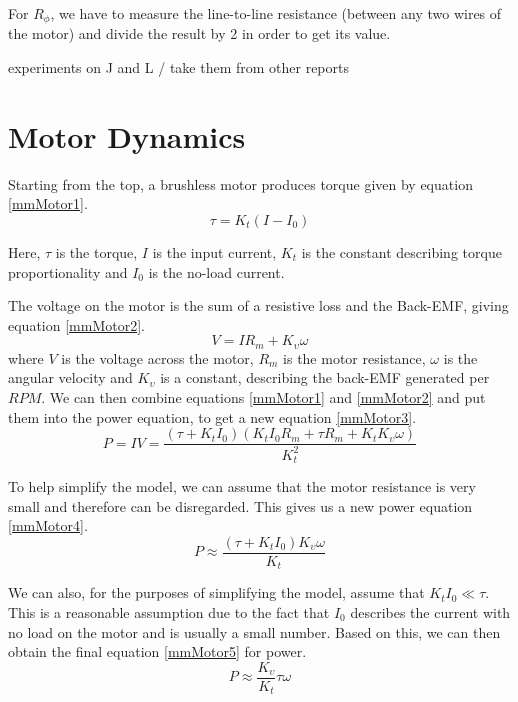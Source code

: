 For $R_{\phi}$, we have to measure the line-to-line resistance (between any two wires of the motor) and divide the result by 2 in order to get its value.

experiments on J and L / take them from other reports 

\clearpage

\section{Motor Dynamics}
Starting from the top, a brushless motor produces torque given by equation \ref{mmMotor1}.
\begin{equation}
\label{mmMotor1}
	\tau = K_t(I-I_0)
\end{equation}

Here, $\tau$ is the torque, $I$ is the input current, $K_t$ is the constant describing torque proportionality and $I_0$ is the no-load current.

The voltage on the motor is the sum of a resistive loss and the Back-EMF, giving equation \ref{mmMotor2}.
\begin{equation}
\label{mmMotor2}
	V = IR_m + K_\upsilon \omega
\end{equation}
where $V$ is the voltage across the motor, $R_m$ is the motor resistance, $\omega$ is the angular velocity and $K_\upsilon $ is a constant, describing the back-EMF generated per $RPM$.
We can then combine equations \ref{mmMotor1} and \ref{mmMotor2} and put them into the power equation, to get a new equation \ref{mmMotor3}.
\begin{equation}
\label{mmMotor3}
	P = IV = \frac{(\tau + K_tI_0)(K_tI_0R_m + \tau R_m + K_tK_\upsilon \omega)}{K_t^2}
\end{equation}

To help simplify the model, we can assume that the motor resistance is very small and therefore can be disregarded. This gives us a new power equation \ref{mmMotor4}.
\begin{equation}
\label{mmMotor4}
	P \approx \frac{(\tau + K_tI_0)K_\upsilon \omega}{K_t}
\end{equation}

We can also, for the purposes of simplifying the model, assume that $K_tI_0\ll \tau$. This is a reasonable assumption due to the fact that $I_0$ describes the current with no load on the motor and is usually a small number. Based on this, we can then obtain the final equation \ref{mmMotor5} for power.
\begin{equation}
\label{mmMotor5}
	P \approx \frac{K_\upsilon }{K_t}\tau \omega
\end{equation}

